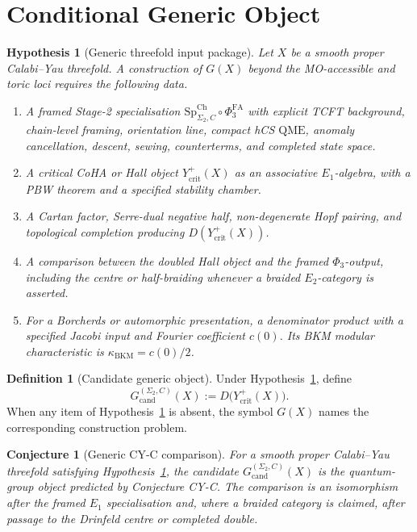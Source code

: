 \documentclass[11pt]{amsart}
\newtheorem{conjecture}[theorem]{Conjecture}
\newtheorem{hypothesis}[theorem]{Hypothesis}
\theoremstyle{definition}
\newtheorem{definition}[theorem]{Definition}
\providecommand{\kBKM}{\kappa_{\mathrm{BKM}}}
\providecommand{\SpCh}{\mathrm{Sp}^{\mathrm{Ch}}}
\providecommand{\Eone}{E_1}
\providecommand{\Etwo}{E_2}
\providecommand{\QME}{\mathrm{QME}}
\begin{document}
\section{Conditional Generic Object}

\begin{hypothesis}[Generic threefold input package]
\label{hyp:generic-GX-input-package}
Let \(X\) be a smooth proper Calabi--Yau threefold.  A construction of
\(G(X)\) beyond the MO-accessible and toric loci requires the following
data.
\begin{enumerate}
\item A framed Stage-2 specialisation
  \(\SpCh_{\Sigma_2,C}\circ \Phi^{\mathrm{FA}}_3\) with explicit TCFT
  background, chain-level framing, orientation line, compact hCS
  \(\QME\), anomaly cancellation, descent, sewing, counterterms, and
  completed state space.
\item A critical CoHA or Hall object \(Y^+_{\mathrm{crit}}(X)\) as an
  associative \(\Eone\)-algebra, with a PBW theorem and a specified
  stability chamber.
\item A Cartan factor, Serre-dual negative half, non-degenerate Hopf
  pairing, and topological completion producing
  \(D(Y^+_{\mathrm{crit}}(X))\).
\item A comparison between the doubled Hall object and the framed
  \(\Phi_3\)-output, including the centre or half-braiding whenever a
  braided \(\Etwo\)-category is asserted.
\item For a Borcherds or automorphic presentation, a denominator product
  with a specified Jacobi input and Fourier coefficient \(c(0)\).  Its
  BKM modular characteristic is \(\kBKM=c(0)/2\).
\end{enumerate}
\end{hypothesis}

\begin{definition}[Candidate generic object]
\label{def:candidate-generic-GX}
Under Hypothesis~\ref{hyp:generic-GX-input-package}, define
\[
  G^{(\Sigma_2,C)}_{\mathrm{cand}}(X)
  :=
  D\bigl(Y^+_{\mathrm{crit}}(X)\bigr).
\]
When any item of Hypothesis~\ref{hyp:generic-GX-input-package} is
absent, the symbol \(G(X)\) names the corresponding construction
problem.
\end{definition}

\begin{conjecture}[Generic CY-C comparison]
\label{conj:generic-GX-CYC}
For a smooth proper Calabi--Yau threefold satisfying
Hypothesis~\ref{hyp:generic-GX-input-package}, the candidate
\(G^{(\Sigma_2,C)}_{\mathrm{cand}}(X)\) is the quantum-group object
predicted by Conjecture CY-C.  The comparison is an isomorphism after
the framed \(\Eone\) specialisation and, where a braided category is
claimed, after passage to the Drinfeld centre or completed double.
\end{conjecture}
\end{document}
